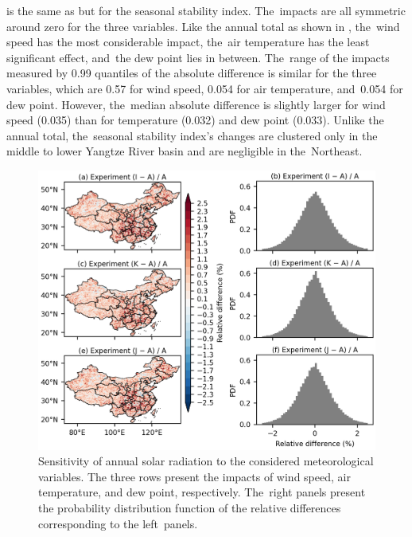 \documentclass[atmosphere,article,accept,pdftex,moreauthors]{Definitions/mdpi}
\begin{document}
 is the same as  but for the seasonal stability index. The~impacts are all symmetric around zero for the three variables. Like the annual total as shown in , the~wind speed has the most considerable impact, the~air temperature has the least significant effect, and~the dew point lies in between. The~range of the impacts measured by 0.99 quantiles of the absolute difference is similar for the three variables, which are 0.57 for wind speed, 0.054 for air temperature, and~0.054 for dew point. However, the~median absolute difference is slightly larger for wind speed (0.035) than for temperature (0.032) and dew point (0.033). Unlike the annual total, the~seasonal stability index's changes are clustered only in the middle to lower Yangtze River basin and are negligible in the~Northeast.

\begin{figure}[H]
  \includegraphics[width=13.8cm]{fig/tmy-ann-var-sensitivity.png}
  \caption{Sensitivity of annual solar radiation to the considered meteorological variables. The three rows present the impacts of wind speed, air temperature, and dew point, respectively. The~right panels present the probability distribution function of the relative differences corresponding to the left~panels.\label{fig:tmy_ann_var_sens}}
\end{figure}
\vspace{-6pt}
\end{document}
